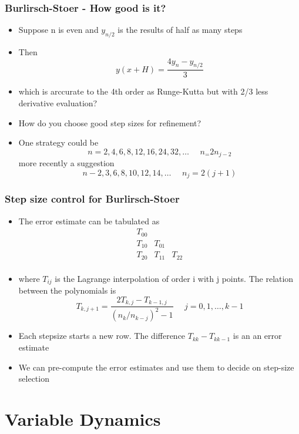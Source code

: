 \documentclass[10pt]{beamer}
\begin{document}
\begin{frame}
  \frametitle{Burlirsch-Stoer - How good is it? }
  \begin{itemize}
  \item Suppose n is even and $y_{n/2}$ is the results of half as many steps    
  \item Then
    \[
      y(x+H) = \frac{4 y_n - y_{n/2}}{3}
    \]
  \item which is arccurate to the 4th order as Runge-Kutta but with
    2/3 less derivative evaluation? 
  \item How do you choose good step sizes for refinement? \pause
  \item One strategy could be
    \[
      n = 2, 4, 6, 8, 12, 16, 24, 32, \ldots \mbox{~~~~} n_ = 2 n_{j-2}
    \]
    more recently a suggestion
    \[
      n - 2, 3, 6, 8, 10, 12, 14, \ldots \mbox{~~~~} n_j = 2(j+1)
    \]
  \end{itemize}  
\end{frame}

\begin{frame}
  \frametitle{Step size control for Burlirsch-Stoer}
  \begin{itemize}
  \item The error estimate can be tabulated as
    \[
      \begin{array}{lll}
        T_{00} && \\
        T_{10} & T_{01} & \\
        T_{20} & T_{11} & T_{22} \\
      \end{array}
    \]
  \item where $T_{ij}$ is the Lagrange interpolation of order i with j points. The relation between the polynomials is
    \[
      T_{k, j+1} = \frac{2 T_{k,j} - T_{k-1,j}}{(n_k / n_{k-j})^2 - 1} \mbox{~~~~} j = 0, 1, \ldots, k-1
    \]
  \item Each stepsize starts a new row. The difference
    $T_{kk} - T_{kk-1}$ is an an error estimate
  \item We can pre-compute the error estimates and use them to decide
    on step-size selection
  \end{itemize}
\end{frame}


\section{Variable Dynamics}
\end{document}
